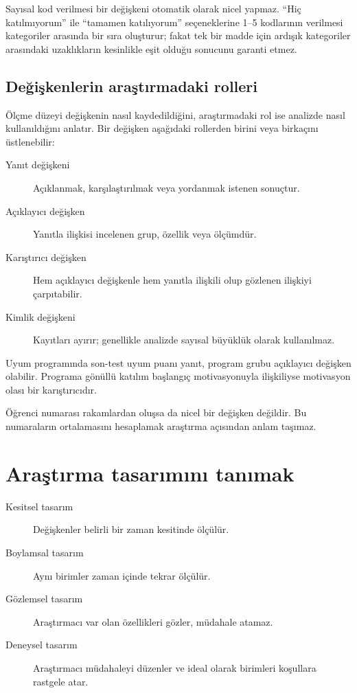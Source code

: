 Sayısal kod verilmesi bir değişkeni otomatik olarak nicel yapmaz. ``Hiç
katılmıyorum'' ile ``tamamen katılıyorum'' seçeneklerine 1--5 kodlarının
verilmesi kategoriler arasında bir sıra oluşturur; fakat tek bir madde için
ardışık kategoriler arasındaki uzaklıkların kesinlikle eşit olduğu sonucunu
garanti etmez.

\subsection{Değişkenlerin araştırmadaki rolleri}

Ölçme düzeyi değişkenin nasıl kaydedildiğini, araştırmadaki rol ise analizde
nasıl kullanıldığını anlatır. Bir değişken aşağıdaki rollerden birini veya
birkaçını üstlenebilir:

\begin{description}
  \item[Yanıt değişkeni] Açıklanmak, karşılaştırılmak veya yordanmak istenen sonuçtur.
  \item[Açıklayıcı değişken] Yanıtla ilişkisi incelenen grup, özellik veya ölçümdür.
  \item[Karıştırıcı değişken] Hem açıklayıcı değişkenle hem yanıtla ilişkili olup gözlenen ilişkiyi çarpıtabilir.
  \item[Kimlik değişkeni] Kayıtları ayırır; genellikle analizde sayısal büyüklük olarak kullanılmaz.
\end{description}

Uyum programında son-test uyum puanı yanıt, program grubu açıklayıcı değişken
olabilir. Programa gönüllü katılım başlangıç motivasyonuyla ilişkiliyse
motivasyon olası bir karıştırıcıdır.

\begin{mistakebox}
Öğrenci numarası rakamlardan oluşsa da nicel bir değişken değildir. Bu
numaraların ortalamasını hesaplamak araştırma açısından anlam taşımaz.
\end{mistakebox}

\section{Araştırma tasarımını tanımak}

\begin{description}
  \item[Kesitsel tasarım] Değişkenler belirli bir zaman kesitinde ölçülür.
  \item[Boylamsal tasarım] Aynı birimler zaman içinde tekrar ölçülür.
  \item[Gözlemsel tasarım] Araştırmacı var olan özellikleri gözler, müdahale atamaz.
  \item[Deneysel tasarım] Araştırmacı müdahaleyi düzenler ve ideal olarak birimleri koşullara rastgele atar.
\end{description}

